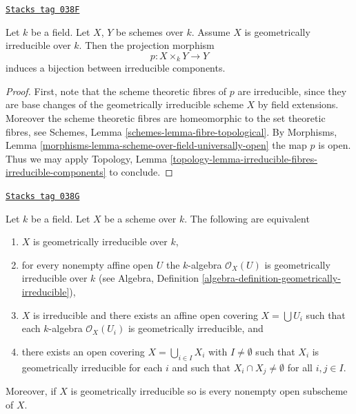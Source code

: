 \begin{lemma}
\label{varieties-lemma-bijection-irreducible-components}
\href{https://stacks.math.columbia.edu/tag/038F}{\texttt{Stacks tag 038F}}

Let $k$ be a field.
Let $X$, $Y$ be schemes over $k$.
Assume $X$ is geometrically irreducible over $k$.
Then the projection morphism
$$
p : X \times_k Y \longrightarrow Y
$$
induces a bijection between irreducible components.
\end{lemma}

\begin{proof}
First, note that the scheme theoretic fibres of $p$ are irreducible,
since they are base changes of the geometrically irreducible scheme $X$
by field extensions. Moreover the scheme theoretic fibres are
homeomorphic to the set theoretic fibres, see
Schemes, Lemma \ref{schemes-lemma-fibre-topological}.
By Morphisms, Lemma \ref{morphisms-lemma-scheme-over-field-universally-open}
the map $p$ is open.
Thus we may apply Topology,
Lemma \ref{topology-lemma-irreducible-fibres-irreducible-components}
to conclude.
\end{proof}

\begin{lemma}
\label{varieties-lemma-geometrically-irreducible-local}
\href{https://stacks.math.columbia.edu/tag/038G}{\texttt{Stacks tag 038G}}


Let $k$ be a field. Let $X$ be a scheme over $k$.
The following are equivalent
\begin{enumerate}
\item $X$ is geometrically irreducible over $k$,
\item for every nonempty affine open $U$ the $k$-algebra $\mathcal{O}_X(U)$
is geometrically irreducible over $k$ (see
Algebra, Definition \ref{algebra-definition-geometrically-irreducible}),
\item $X$ is irreducible and there exists an affine open covering
$X = \bigcup U_i$ such that each $k$-algebra $\mathcal{O}_X(U_i)$ is
geometrically irreducible, and
\item there exists an open covering $X = \bigcup_{i \in I} X_i$
with $I \not = \emptyset$ such
that $X_i$ is geometrically irreducible for each $i$ and such that
$X_i \cap X_j \not = \emptyset$ for all $i, j \in I$.
\end{enumerate}
Moreover, if $X$ is geometrically irreducible so is every nonempty
open subscheme of $X$.
\end{lemma}

